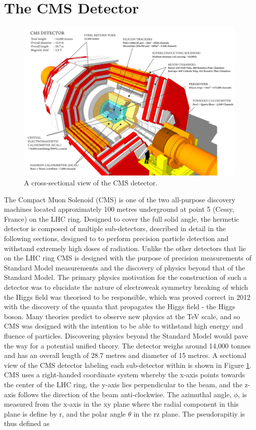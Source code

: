 \newpage

\section{The CMS Detector} \label{sec-TheCMSDetector}

\begin{figure} [h!] \label{fig-CMSDetector}
\includegraphics[width=\textwidth]{Figures/CMSDetector.png}
\caption{A cross-sectional view of the CMS detector.}
\end{figure}

The Compact Muon Solenoid (CMS) \cite{CMSexperiment} is one of the two all-purpose discovery machines located approximately 100 metres underground at point 5 (Cessy, France) on the LHC ring. Designed to cover the full solid angle, the hermetic detector is composed of multiple sub-detectors, described in detail in the following sections, designed to to perform precision particle detection and withstand extremely high doses of radiation. Unlike the other detectors that lie on the LHC ring CMS is designed with the purpose of precision measurements of Standard Model measurements and the discovery of physics beyond that of the Standard Model. The primary physics motivation for the construction of such a detector was to elucidate the nature of electroweak symmetry breaking of which the Higgs field was theorised to be responsible, which was proved correct in 2012 with the discovery of the quanta that propagates the Higgs field - the Higgs boson. Many theories predict to observe new physics at the TeV scale, and so CMS was designed with the intention to be able to withstand high energy and fluence of particles. Discovering physics beyond the Standard Model would pave the way for a potential unified theory. The detector weighs around 14,000 tonnes and has an overall length of 28.7 metres and diameter of 15 metres. A sectional view of the CMS detector labeling each sub-detector within is shown in Figure \ref{fig-CMSDetector}. CMS uses a right-handed coordinate system whereby the x-axis points towards the center of the LHC ring, the y-axis lies perpendicular to the beam, and the z-axis follows the direction of the beam anti-clockwise. The azimuthal angle, $\phi$, is measured from the x-axis in the xy plane where the radial component in this plane is define by r, and the polar angle $\theta$ in the rz plane. The pseudorapitiy is thus defined as 

